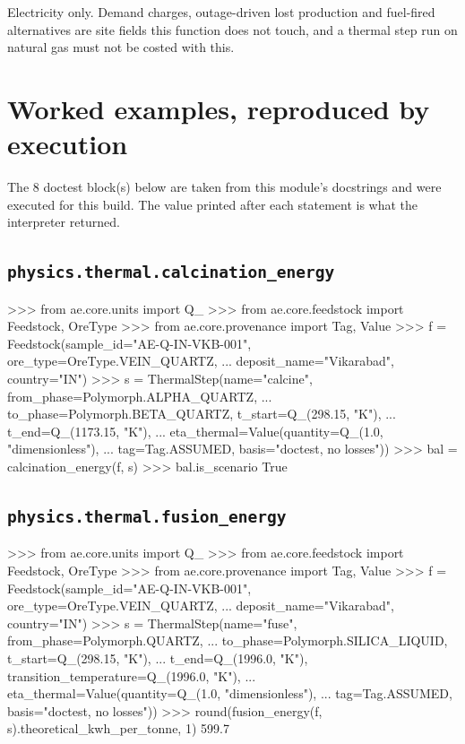 \documentclass[10pt,a4paper,twoside]{report}
\begin{document}
Electricity only. Demand charges, outage-driven lost production and fuel-fired alternatives are site fields this function does not touch, and a thermal step run on natural gas must not be costed with this.

\section{Worked examples, reproduced by execution}

The 8 doctest block(s) below are taken from this module's docstrings and were executed for this build. The value printed after each statement is what the interpreter returned.

\subsection*{\texttt{physics.thermal.calcination\_energy}}

\begin{doctestblock}
>>> from ae.core.units import Q_
>>> from ae.core.feedstock import Feedstock, OreType
>>> from ae.core.provenance import Tag, Value
>>> f = Feedstock(sample_id="AE-Q-IN-VKB-001", ore_type=OreType.VEIN_QUARTZ,
...               deposit_name="Vikarabad", country="IN")
>>> s = ThermalStep(name="calcine", from_phase=Polymorph.ALPHA_QUARTZ,
...                 to_phase=Polymorph.BETA_QUARTZ, t_start=Q_(298.15, "K"),
...                 t_end=Q_(1173.15, "K"),
...                 eta_thermal=Value(quantity=Q_(1.0, "dimensionless"),
...                                   tag=Tag.ASSUMED, basis="doctest, no losses"))
>>> bal = calcination_energy(f, s)
>>> bal.is_scenario
True
\end{doctestblock}

\subsection*{\texttt{physics.thermal.fusion\_energy}}

\begin{doctestblock}
>>> from ae.core.units import Q_
>>> from ae.core.feedstock import Feedstock, OreType
>>> from ae.core.provenance import Tag, Value
>>> f = Feedstock(sample_id="AE-Q-IN-VKB-001", ore_type=OreType.VEIN_QUARTZ,
...               deposit_name="Vikarabad", country="IN")
>>> s = ThermalStep(name="fuse", from_phase=Polymorph.QUARTZ,
...                 to_phase=Polymorph.SILICA_LIQUID, t_start=Q_(298.15, "K"),
...                 t_end=Q_(1996.0, "K"), transition_temperature=Q_(1996.0, "K"),
...                 eta_thermal=Value(quantity=Q_(1.0, "dimensionless"),
...                                   tag=Tag.ASSUMED, basis="doctest, no losses"))
>>> round(fusion_energy(f, s).theoretical_kwh_per_tonne, 1)
599.7
\end{doctestblock}
\end{document}
